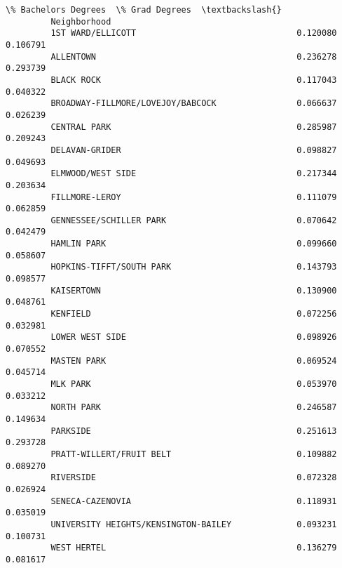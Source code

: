 \documentclass[11pt]{article}
\begin{document}
\begin{Verbatim}[commandchars=\\\{\}]
                                               \% Bachelors Degrees  \% Grad Degrees  \textbackslash{}
         Neighborhood                                                                
         1ST WARD/ELLICOTT                                0.120080        0.106791   
         ALLENTOWN                                        0.236278        0.293739   
         BLACK ROCK                                       0.117043        0.040322   
         BROADWAY-FILLMORE/LOVEJOY/BABCOCK                0.066637        0.026239   
         CENTRAL PARK                                     0.285987        0.209243   
         DELAVAN-GRIDER                                   0.098827        0.049693   
         ELMWOOD/WEST SIDE                                0.217344        0.203634   
         FILLMORE-LEROY                                   0.111079        0.062859   
         GENNESSEE/SCHILLER PARK                          0.070642        0.042479   
         HAMLIN PARK                                      0.099660        0.058607   
         HOPKINS-TIFFT/SOUTH PARK                         0.143793        0.098577   
         KAISERTOWN                                       0.130900        0.048761   
         KENFIELD                                         0.072256        0.032981   
         LOWER WEST SIDE                                  0.098926        0.070552   
         MASTEN PARK                                      0.069524        0.045714   
         MLK PARK                                         0.053970        0.033212   
         NORTH PARK                                       0.246587        0.149634   
         PARKSIDE                                         0.251613        0.293728   
         PRATT-WILLERT/FRUIT BELT                         0.109882        0.089270   
         RIVERSIDE                                        0.072328        0.026924   
         SENECA-CAZENOVIA                                 0.118931        0.035019   
         UNIVERSITY HEIGHTS/KENSINGTON-BAILEY             0.093231        0.100731   
         WEST HERTEL                                      0.136279        0.081617   
         

\end{Verbatim}
\end{document}
